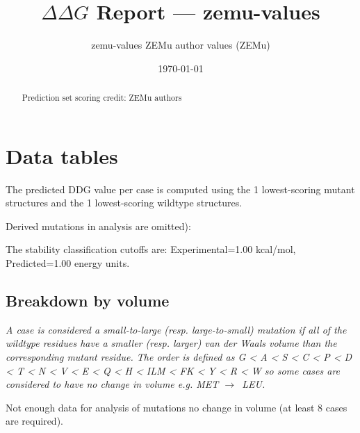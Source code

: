 \documentclass[10pt, letterpaper, oneside, titlepage, landscape]{scrreprt}
\title{$\Delta\Delta G$ Report --- zemu-values}
\subtitle{zemu-values ZEMu author values (ZEMu)}
\date{\today}
\begin{document}
\maketitle
\tableofcontents

\clearpage

\begin{abstract}
Prediction set scoring credit: ZEMu authors

\end{abstract}


\clearpage

\section{Data tables}

The predicted DDG value per case is computed using the 1 lowest-scoring mutant structures and the 1 lowest-scoring wildtype structures.

Derived mutations in analysis are omitted):

The stability classification cutoffs are: Experimental=1.00 kcal/mol, Predicted=1.00 energy units.
\subsection{Breakdown by volume}
\textit{A case is considered a small-to-large (resp. large-to-small) mutation if all of the wildtype residues have a smaller (resp. larger) van der Waals volume than the corresponding mutant residue. The order is defined as G < A < S < C < P < D < T < N < V < E < Q < H < ILM < FK < Y < R < W so some cases are considered to have no change in volume e.g. MET $\rightarrow$\ LEU.}

Not enough data for analysis of mutations no change in volume (at least 8 cases are required).
\end{document}
